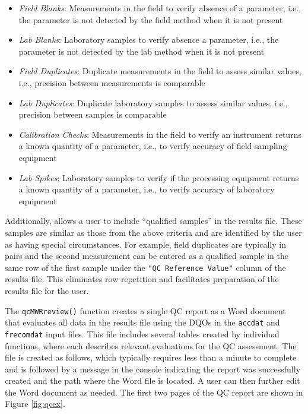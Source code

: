 \begin{itemize}
\tightlist
\item
  \emph{Field Blanks}: Measurements in the field to verify absence of a parameter, i.e., the parameter is not detected by the field method when it is not present
\item
  \emph{Lab Blanks}: Laboratory samples to verify absence a parameter, i.e., the parameter is not detected by the lab method when it is not present
\item
  \emph{Field Duplicates}: Duplicate measurements in the field to assess similar values, i.e., precision between measurements is comparable
\item
  \emph{Lab Duplicates}: Duplicate laboratory samples to assess similar values, i.e., precision between samples is comparable
\item
  \emph{Calibration Checks}: Measurements in the field to verify an instrument returns a known quantity of a parameter, i.e., to verify accuracy of field sampling equipment
\item
  \emph{Lab Spikes}: Laboratory samples to verify if the processing equipment returns a known quantity of a parameter, i.e., to verify accuracy of laboratory equipment
\end{itemize}

Additionally,  allows a user to include ``qualified samples'' in the results file. These samples are similar as those from the above criteria and are identified by the user as having special circumstances. For example, field duplicates are typically in pairs and the second measurement can be entered as a qualified sample in the same row of the first sample under the \texttt{"QC\ Reference\ Value"} column of the results file. This eliminates row repetition and facilitates preparation of the results file for the user.

The \texttt{qcMWRreview()} function creates a single QC report as a Word document that evaluates all data in the results file using the DQOs in the \texttt{accdat} and \texttt{frecomdat} input files. This file includes several tables created by individual  functions, where each describes relevant evaluations for the QC assessment. The file is created as follows, which typically requires less than a minute to complete and is followed by a message in the console indicating the report was successfully created and the path where the Word file is located. A user can then further edit the Word document as needed. The first two pages of the QC report are shown in Figure \ref{fig:qcex}.

